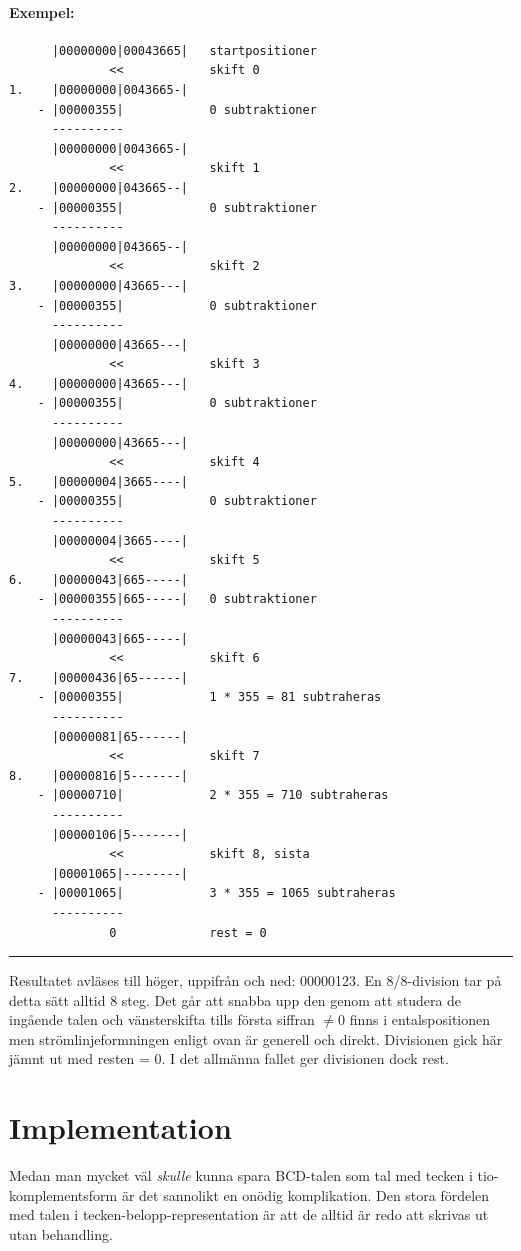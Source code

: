 \documentclass[oneside,10pt,a4paper,swedish]{scrbook}
\newcommand{\startex}[1]{\subsubsection{Exempel: #1}}
\newcommand{\slutex}{\vspace{-8mm}\begin{flushright} \rule{1ex}{1ex} \end{flushright}}
\begin{document}
\startex{}
\begin{center}
\begin{lstlisting}
      |00000000|00043665|   startpositioner 
              <<            skift 0
1.    |00000000|0043665-|    
    - |00000355|            0 subtraktioner
      ----------
      |00000000|0043665-| 
              <<            skift 1
2.    |00000000|043665--|   
    - |00000355|            0 subtraktioner
      ----------
      |00000000|043665--| 
              <<            skift 2
3.    |00000000|43665---|    
    - |00000355|            0 subtraktioner
      ----------
      |00000000|43665---|
              <<            skift 3
4.    |00000000|43665---|   
    - |00000355|            0 subtraktioner
      ----------
      |00000000|43665---|    
              <<            skift 4
5.    |00000004|3665----|   
    - |00000355|            0 subtraktioner
      ----------
      |00000004|3665----| 
              <<            skift 5
6.    |00000043|665-----|
    - |00000355|665-----|   0 subtraktioner
      ----------
      |00000043|665-----| 
              <<            skift 6
7.    |00000436|65------|
    - |00000355|            1 * 355 = 81 subtraheras
      ----------
      |00000081|65------|
              <<            skift 7
8.    |00000816|5-------|
    - |00000710|            2 * 355 = 710 subtraheras
      ----------
      |00000106|5-------|
              <<            skift 8, sista
      |00001065|--------|   
    - |00001065|            3 * 355 = 1065 subtraheras
      ----------
              0             rest = 0
\end{lstlisting}
\end{center}
\slutex

Resultatet avläses till höger, uppifrån och ned: 00000123. En 8/8-division tar på detta sätt alltid 8 steg. Det går att snabba upp den genom att studera de ingående talen och vänsterskifta tills första siffran $\neq 0$ finns i entalspositionen men strömlinjeformningen enligt ovan är generell och direkt. Divisionen gick här jämnt ut med resten = 0. I det allmänna fallet ger divisionen dock rest.

\chapter{Implementation}

Medan man mycket väl \emph{skulle} kunna spara BCD-talen som tal med tecken i tio-komplementsform är det sannolikt en onödig komplikation. Den stora fördelen med talen i tecken-belopp-representation är att de alltid är redo att skrivas ut utan behandling. 
\end{document}
